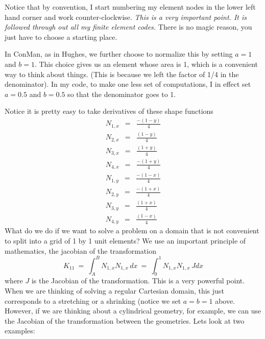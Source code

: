 \documentclass{article}
\begin{document}
Notice that by convention, I start numbering my element nodes in the lower left
hand corner and work counter-clockwise.   {\em This is a very important point. 
It is followed through out all my finite element codes.}  There is no magic
reason, you just have to choose a starting place.

In ConMan, as in Hughes, we further choose to normalize this by setting $a = 1$
and $b=1$.  This choice gives us an element whose area is 1, which is a
convenient way to think about things.  (This is because we left the factor of
1/4 in the denominator).  In my code, to make one less set of computations, I in
effect set $a=0.5$ and $b=0.5$ so that the denominator goes to 1.

Notice it is pretty easy to take derivatives of these shape functions
\begin{eqnarray} 
N_{1,x} & = & \frac{-(1-y)}{4}  \\ 
N_{2,x} & = & \frac{(1-y)}{4}  \\ 
N_{3,x} & = & \frac{(1+y)}{4}  \\ 
N_{4,x} & = & \frac{-(1+y)}{4}  
\end{eqnarray}
\begin{eqnarray}  
N_{1,y} & = & \frac{-(1-x)}{4}  \\  
N_{2,y} & = & \frac{-(1+x)}{4}  \\  
N_{3,y} & = & \frac{(1+x)}{4}  \\  
N_{4,y} & = & \frac{(1-x)}{4}  
\end{eqnarray}
What do we do if we want to solve a problem on a domain that is not convenient
to split into a grid of 1 by 1 unit elements?   We use an important principle
of mathematics, the jacobian of the transformation
\begin{equation}
K_{11} ~=~ \int _A ^B N_{1,x} N_{1,x} \, dx ~=~ \int _0 ^1 N_{1,x} N_{1,x} \,
J dx
\end{equation}
where $J$ is the Jacobian of the transformation.  This is a very powerful
point.   When we are thinking of solving a regular Cartesian domain, this just
corresponds to a stretching or a shrinking (notice we set $a=b=1$ above.  
However, if we are thinking about a cylindrical geometry, for example, we can
use the Jacobian of the transformation between the geometries.   Lets look at two
examples:
\end{document}
